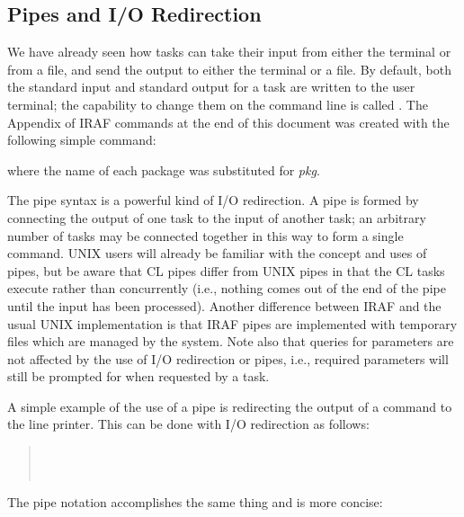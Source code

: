\subsection{Pipes and I/O Redirection}

\ppind
We have already seen how tasks can take their input from either the
terminal or from a file, and send the output to either the terminal
or a file.  By default, both the standard input and standard output for a
task are written to the user terminal; the capability to change them
on the command line is called .  The Appendix of
IRAF commands at the end of this document was created with the 
following simple command:

\begin{quotation}\noindent
{} 
\end{quotation}

\noindent
where the name of each package was substituted for {\it pkg}.

The pipe syntax is a powerful kind of I/O redirection. A pipe is formed by
connecting the output of one task to the input of another task; an arbitrary
number of tasks may be connected together in this way to form a single command.
UNIX users will already be familiar with the concept and uses of pipes,
but be aware that CL pipes differ from UNIX pipes in that the CL tasks
execute  rather than concurrently (i.e., nothing comes out
of the end of the pipe until  the input has been processed).
Another difference between IRAF and the usual UNIX implementation
is that IRAF pipes are implemented with temporary files which are
managed by the system.
Note also that queries for parameters are not affected by the use of 
I/O redirection or pipes, i.e., required parameters will still be 
prompted for when requested by a task.

A simple example of the use of a pipe is redirecting the output of a command
to the line printer.  This can be done with I/O redirection as follows:

\begin{quotation}\noindent
{}  \\
  \\
 
\end{quotation}

\noindent
The pipe notation accomplishes the same thing and is more concise:

